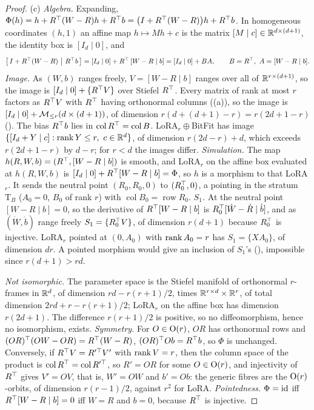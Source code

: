 \begin{proof}
(c) \emph{Algebra.} Expanding, $\Phi(h)=h+R^{\top}(W-R)h+R^{\top} b=\big(I+R^{\top}(W-R)\big)h+R^{\top} b$. In homogeneous coordinates $(h,1)$ an
affine map $h\mapsto Mh+c$ is the matrix $[M\mid c]\in\mathbb{R}^{d\times(d+1)}$, the identity box is $[I_d\mid0]$, and
\[\big[\,I+R\T(W-R)\ \big|\ R\T b\,\big]=[I_d\mid0]+R\T\,[W-R\mid b]=[I_d\mid0]+BA,\qquad B=R\T,\ A=[W-R\mid b].\]
\emph{Image.} As $(W,b)$ ranges freely, $V=[W-R\mid b]$ ranges over all of $\mathbb{R}^{r\times(d+1)}$, so the image is
$[I_d\mid0]+\{R^{\top} V\}$ over Stiefel $R^{\top}$. Every matrix of rank at most $r$ factors as $R^{\top} V$ with $R^{\top}$ having orthonormal
columns ((a)), so the image is $[I_d\mid0]+\mathcal{M}_{\le r}(d\times(d+1))$, of dimension $r(d+(d+1)-r)=r(2d+1-r)$
(). The bias $R^{\top} b$ lies in $\operatorname{col}R^{\top}=\operatorname{col}B$. LoRA$_r{}\oplus{}$BitFit has image
$\{[I_d+Y\mid c]:\rk Y\le r,\ c\in\R^d\}$, of dimension $r(2d-r)+d$, which exceeds $r(2d+1-r)$ by $d-r$; for $r<d$ the images
differ. \emph{Simulation.} The map $h(R,W,b)=(R^{\top},[W-R\mid b])$ is smooth, and LoRA$_r$ on the affine box evaluated at $h(R,W,b)$ is
$[I_d\mid0]+R^{\top}[W-R\mid b]=\Phi$, so $h$ is a morphism to that LoRA$_r$. It sends the neutral point $(R_0,R_0,0)$ to $(R_0^{\top},0)$, a pointing in the stratum $\mathrm T_B$
($A_0=0$, $B_0$ of rank $r$) with $\operatorname{col}B_0=\operatorname{row}R_0$. \emph{$S_1$.} At the neutral point
$[W-R\mid b]=0$, so the derivative of $R^{\top}[W-R\mid b]$ is $R_0^{\top}[\dot W-\dot R\mid\dot b]$, and as $(\dot W,\dot b)$ range freely
$S_1=\{R_0^{\top} V\}$, of dimension $r(d+1)$ because $R_0^{\top}$ is injective. LoRA$_r$ pointed at $(0,A_0)$ with $\operatorname{rank} A_0=r$ has
$S_1=\{XA_0\}$, of dimension $dr$. A pointed morphism would give an inclusion of $S_1$'s (), impossible
since $r(d+1)>rd$.

\emph{Not isomorphic.} The parameter space is the Stiefel manifold of orthonormal $r$-frames in $\mathbb{R}^d$, of dimension
$rd-r(r+1)/2$, times $\mathbb{R}^{r\times d}\times\mathbb{R}^r$, of total dimension $2rd+r-r(r+1)/2$; LoRA$_r$ on the affine box has dimension
$r(2d+1)$. The difference $r(r+1)/2$ is positive, so no diffeomorphism, hence no isomorphism, exists. \emph{Symmetry.} For
$O\in\mathrm{O}(r)$, $OR$ has orthonormal rows and $(OR)^{\top}(OW-OR)=R^{\top}(W-R)$, $(OR)^{\top} Ob=R^{\top} b$, so $\Phi$ is unchanged. Conversely, if
$R^{\top} V=R'^{\top}V'$ with $\operatorname{rank} V=r$, then the column space of the product is $\operatorname{col}R^{\top}=\operatorname{col}R'^{\top}$, so
$R'=OR$ for some $O\in\mathrm{O}(r)$, and injectivity of $R^{\top}$ gives $V'=OV$, that is, $W'=OW$ and $b'=Ob$: the generic fibres are the
$\mathrm{O}(r)$-orbits, of dimension $r(r-1)/2$, against $r^2$ for LoRA. \emph{Pointedness.} $\Phi=\mathrm{id}$ iff $R^{\top}[W-R\mid b]=0$ iff
$W=R$ and $b=0$, because $R^{\top}$ is injective.


\end{proof}

